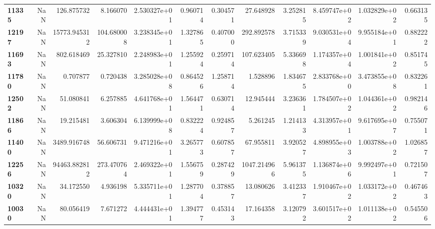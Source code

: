\begin{table}[h]
\begin{tabular}{lrrrrrrrrrrr}
\textbf{11335} &       NaN &     126.875732 &        8.166070 &               2.530327e+01 &  0.960714 &  0.304571 &    27.648928 &   3.252815 &  8.459747e+02 &  1.032829e+02 &     0.663135 \\
\textbf{12197} &       NaN &   15773.945312 &      104.680008 &               3.238345e+01 &  1.327865 &  0.407000 &   292.892578 &   3.715339 &  9.030531e+04 &  9.955184e+01 &     0.882222 \\
\textbf{11693} &       NaN &     802.618469 &       25.327810 &               2.248983e+01 &  1.255924 &  0.259714 &   107.623405 &   5.336698 &  1.174357e+04 &  1.001841e+02 &     0.851745 \\
\textbf{11780} &       NaN &       0.707877 &        0.720438 &               3.285028e+08 &  0.864526 &  1.258714 &     1.528896 &   1.834675 &  2.833768e+00 &  3.473855e+08 &     0.832261 \\
\textbf{12502} &       NaN &      51.080841 &        6.257885 &               4.641768e+01 &  1.564471 &  0.630714 &    12.945444 &   3.236361 &  1.784507e+02 &  1.044361e+02 &     0.982146 \\
\textbf{11866} &       NaN &      19.215481 &        3.606304 &               6.139999e+08 &  0.832224 &  0.924857 &     5.261245 &   1.214133 &  4.313957e+01 &  9.617695e+07 &     0.755071 \\
\textbf{11400} &       NaN &    3489.916748 &       56.606731 &               9.471216e+01 &  3.265773 &  0.607857 &    67.955811 &   3.920527 &  4.898955e+03 &  1.003788e+02 &     1.026857 \\
\textbf{12256} &       NaN &   94463.882812 &      273.470764 &               2.469322e+01 &  1.556759 &  0.287429 &  1047.214966 &   5.961375 &  1.136874e+06 &  9.992497e+01 &     0.721507 \\
\textbf{10320} &       NaN &      34.172550 &        4.936198 &               5.335711e+01 &  1.287704 &  0.378857 &    13.080626 &   3.412337 &  1.910467e+02 &  1.033172e+02 &     0.467463 \\
\textbf{10030} &       NaN &      80.056419 &        7.671272 &               4.444431e+01 &  1.394777 &  0.453143 &    17.164358 &   3.120792 &  3.601517e+02 &  1.011138e+02 &     0.545506 \\
\bottomrule
\end{tabular}
\end{table}
